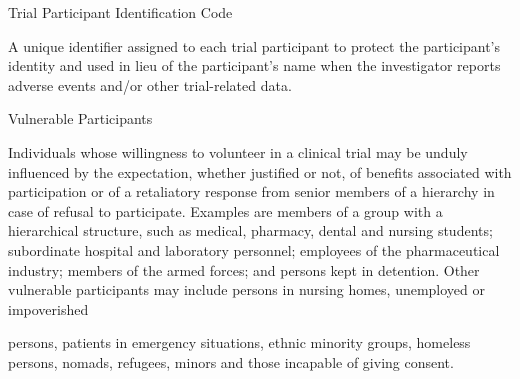 \documentclass[11pt]{article}
\begin{document}
Trial Participant Identification Code


A unique identifier assigned to each trial participant to protect the participant's identity and used in lieu of the participant's name when the investigator reports adverse events and/or other trial-related data.


Vulnerable Participants


Individuals whose willingness to volunteer in a clinical trial may be unduly influenced by the expectation, whether justified or not, of benefits associated with participation or of a retaliatory response from senior members of a hierarchy in case of refusal to participate. Examples are members of a group with a hierarchical structure, such as medical, pharmacy, dental and nursing students; subordinate hospital and laboratory personnel; employees of the pharmaceutical industry; members of the armed forces; and persons kept in detention. Other vulnerable participants may include persons in nursing homes, unemployed or impoverished


persons, patients in emergency situations, ethnic minority groups, homeless persons, nomads, refugees, minors and those incapable of giving consent.

\clearpage
\nocite{ich-e6-r3}
\printbibliography[title={Bibliography}]
\end{document}
